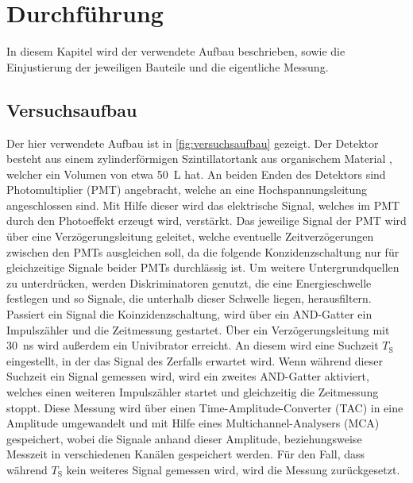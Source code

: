\section{Durchführung}
\label{sec:durchfuehrung}

In diesem Kapitel wird der verwendete Aufbau beschrieben,
sowie die Einjustierung der jeweiligen Bauteile und die eigentliche Messung.

\subsection{Versuchsaufbau}

Der hier verwendete Aufbau ist in \autoref{fig:versuchsaufbau} gezeigt.
Der Detektor besteht aus einem zylinderförmigen Szintillatortank aus organischem Material \cite{kolanoskiwermes},
welcher ein Volumen von etwa \SI{50}{\liter} hat.
An beiden Enden des Detektors sind Photomultiplier (PMT) \cite{wrleo} angebracht,
welche an eine Hochspannungsleitung angeschlossen sind.
Mit Hilfe dieser wird das elektrische Signal,
welches im PMT durch den Photoeffekt erzeugt wird,
verstärkt.
Das jeweilige Signal der PMT wird über eine Verzögerungsleitung geleitet,
welche eventuelle Zeitverzögerungen zwischen den PMTs ausgleichen soll,
da die folgende Konzidenzschaltung nur für gleichzeitige Signale beider PMTs durchlässig ist.
Um weitere Untergrundquellen zu unterdrücken,
werden Diskriminatoren genutzt,
die eine Energieschwelle festlegen und so Signale,
die unterhalb dieser Schwelle liegen,
herausfiltern. 
Passiert ein Signal die Koinzidenzschaltung,
wird über ein AND-Gatter ein Impulszähler und die Zeitmessung gestartet.
Über ein Verzögerungsleitung mit \SI{30}{\nano\second} wird außerdem ein Univibrator erreicht. 
An diesem wird eine Suchzeit $T_\text{S}$ eingestellt,
in der das Signal des Zerfalls erwartet wird.
Wenn während dieser Suchzeit ein Signal gemessen wird,
wird ein zweites AND-Gatter aktiviert,
welches einen weiteren Impulszähler startet und gleichzeitig die Zeitmessung stoppt.
Diese Messung wird über einen Time-Amplitude-Converter (TAC) \cite{wrleo} in eine Amplitude umgewandelt und mit Hilfe eines Multichannel-Analysers (MCA) \cite{wrleo} gespeichert,
wobei die Signale anhand dieser Amplitude,
beziehungsweise Messzeit in verschiedenen Kanälen gespeichert werden.
Für den Fall,
dass während $T_\text{S}$ kein weiteres Signal gemessen wird,
wird die Messung zurückgesetzt.

